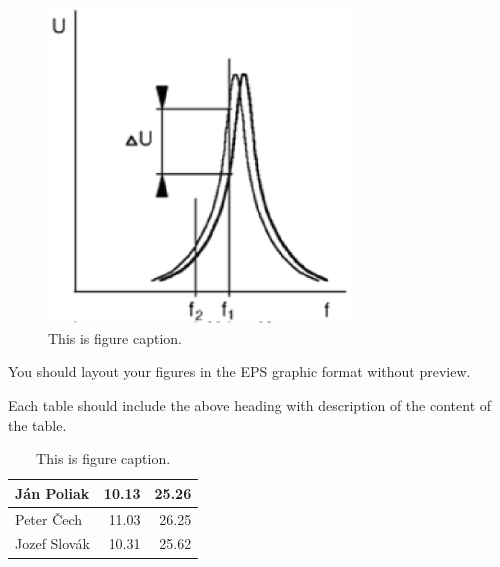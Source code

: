 \documentclass[twoside]{articlek}
\begin{document}
%
\begin{figure} [h,t]                     %
\begin{center}                        %
\includegraphics[width=80mm]{fig1.eps}   %
\end{center}                         %
\vspace{-2mm} \caption{This is figure caption.}
\end{figure}                        %

You should layout your figures in the EPS graphic format without
preview.

Each table should include the above heading with description of
the content of the table.

\begin{table}[ht]
\begin{center}
 \caption{This is figure caption.}
\begin{tabular}{|l|r|r|}
\hline
J\'{a}n Poliak\hbox{\hspace{.5cm}}&\hbox{\hspace{1.5cm}}10.13&\hbox{\hspace{1.5cm}}25.26\\
\hline
Peter \v{C}ech&11.03&26.25\\
\hline
Jozef Slov\'{a}k&10.31&25.62\\
\hline
\end{tabular}
\end{center}
\end{table}
\end{document}
